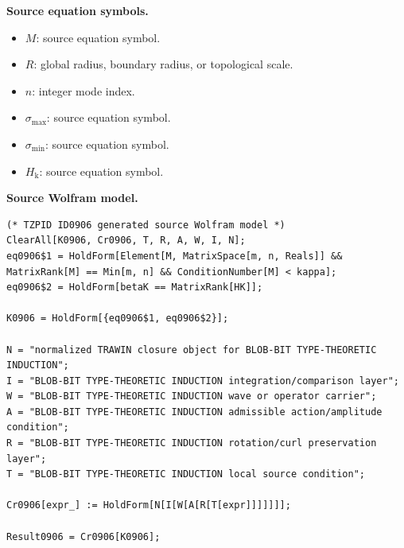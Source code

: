 \begin{minipage}[t]{0.49\linewidth}
\begingroup
\small
\raggedright
\textbf{Source equation symbols.}\par
\begin{itemize}[leftmargin=1.35em,itemsep=1pt,topsep=1pt,parsep=0pt]
    \item $M$: source equation symbol.
    \item $R$: global radius, boundary radius, or topological scale.
    \item $n$: integer mode index.
    \item $\sigma_{\mathrm{max}}$: source equation symbol.
    \item $\sigma_{\min}$: source equation symbol.
    \item $H_{\mathrm{k}}$: source equation symbol.
\end{itemize}
\endgroup
\end{minipage}\hfill
\begin{minipage}[t]{0.47\linewidth}
\begingroup
\scriptsize
\raggedright
\textbf{Source Wolfram model.}\par
\begin{Verbatim}[fontsize=\tiny,breaklines=true,breakanywhere=true]
(* TZPID ID0906 generated source Wolfram model *)
ClearAll[K0906, Cr0906, T, R, A, W, I, N];
eq0906$1 = HoldForm[Element[M, MatrixSpace[m, n, Reals]] && MatrixRank[M] == Min[m, n] && ConditionNumber[M] < kappa];
eq0906$2 = HoldForm[betaK == MatrixRank[HK]];

K0906 = HoldForm[{eq0906$1, eq0906$2}];

N = "normalized TRAWIN closure object for BLOB-BIT TYPE-THEORETIC INDUCTION";
I = "BLOB-BIT TYPE-THEORETIC INDUCTION integration/comparison layer";
W = "BLOB-BIT TYPE-THEORETIC INDUCTION wave or operator carrier";
A = "BLOB-BIT TYPE-THEORETIC INDUCTION admissible action/amplitude condition";
R = "BLOB-BIT TYPE-THEORETIC INDUCTION rotation/curl preservation layer";
T = "BLOB-BIT TYPE-THEORETIC INDUCTION local source condition";

Cr0906[expr_] := HoldForm[N[I[W[A[R[T[expr]]]]]]];

Result0906 = Cr0906[K0906];
\end{Verbatim}
\endgroup
\end{minipage}

